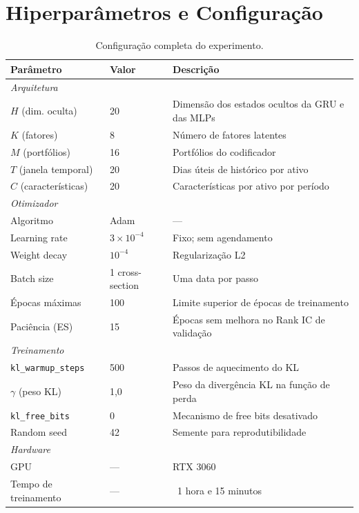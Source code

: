 \chapter{Hiperparâmetros e Configuração}
\label{ap:hiperparametros}

\begin{table}[htbp]
    \centering
    \caption{Configuração completa do experimento.}
    \label{tab:hiperparametros}
    \begin{tabular}{lll}
        \toprule
        \textbf{Parâmetro} & \textbf{Valor} & \textbf{Descrição} \\
        \midrule
        \multicolumn{3}{l}{\textit{Arquitetura}} \\
        $H$ (dim. oculta)      & 20  & Dimensão dos estados ocultos da GRU e das MLPs \\
        $K$ (fatores)          & 8   & Número de fatores latentes \\
        $M$ (portfólios)       & 16  & Portfólios do codificador \\
        $T$ (janela temporal)  & 20  & Dias úteis de histórico por ativo \\
        $C$ (características)  & 20  & Características por ativo por período \\
        \midrule
        \multicolumn{3}{l}{\textit{Otimizador}} \\
        Algoritmo              & Adam  & --- \\
        Learning rate          & $3 \times 10^{-4}$ & Fixo; sem agendamento \\
        Weight decay           & $10^{-4}$          & Regularização L2 \\
        Batch size             & 1 cross-section    & Uma data por passo \\
        Épocas máximas         & 100   & Limite superior de épocas de treinamento \\
        Paciência (ES)         & 15    & Épocas sem melhora no Rank IC de validação \\
        \midrule
        \multicolumn{3}{l}{\textit{Treinamento}} \\
        \texttt{kl\_warmup\_steps}  & 500  & Passos de aquecimento do KL \\
        $\gamma$ (peso KL)     & 1{,}0   & Peso da divergência KL na função de perda \\
        \texttt{kl\_free\_bits}& 0     & Mecanismo de free bits desativado \\
        Random seed            & 42    & Semente para reprodutibilidade \\
        \midrule
        \multicolumn{3}{l}{\textit{Hardware}} \\
        GPU                    & ---   & RTX 3060 \\
        Tempo de treinamento   & ---   & ~1 hora e 15 minutos \\
        \bottomrule
    \end{tabular}
\end{table}
